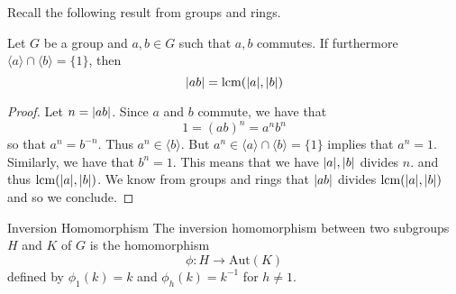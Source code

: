 \documentclass[a4paper]{article}
\begin{document}
Recall the following result from groups and rings. 

\begin{prp}{}{} Let $G$ be a group and $a,b\in G$ such that $a,b$ commutes. If furthermore $\langle a\rangle\cap\langle b\rangle=\{1\}$, then $$\abs{ab}=\operatorname{lcm}(\abs{a},\abs{b})$$ 
\begin{proof}
Let $n=\abs{ab}$. Since $a$ and $b$ commute, we have that $$1=(ab)^n=a^nb^n$$ so that $a^n=b^{-n}$. Thus $a^n\in\langle b\rangle$. But $a^n\in\langle a\rangle\cap\langle b\rangle=\{1\}$ implies that $a^n=1$. Similarly, we have that $b^n=1$. This means that we have $\abs{a},\abs{b}$ divides $n$. and thus $\operatorname{lcm}(\abs{a},\abs{b})$. We know from groups and rings that $\abs{ab}$ divides $\operatorname{lcm}(\abs{a},\abs{b})$ and so we conclude. 
\end{proof}
\end{prp}

\begin{defn}{Inversion Homomorphism}{} The inversion homomorphism between two subgroups $H$ and $K$ of $G$ is the homomorphism $$\phi:H\to\text{Aut}(K)$$ defined by $\phi_1(k)=k$ and $\phi_h(k)=k^{-1}$ for $h\neq 1$. 
\end{defn}
\end{document}
